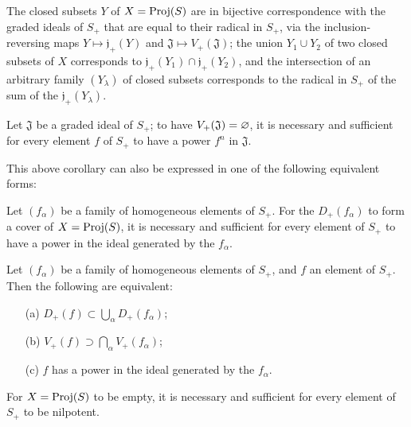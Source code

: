 \begin{corollary}[2.3.12]
\label{II.2.3.12}
The closed subsets $Y$ of $X=\operatorname{Proj}(S)$ are in bijective correspondence with the graded ideals of $S_+$ that are equal to their radical in $S_+$, via the inclusion-reversing maps $Y\mapsto\mathfrak{j}_+(Y)$ and $\mathfrak{J}\mapsto V_+(\mathfrak{J})$;
the union $Y_1\cup Y_2$ of two closed subsets of $X$ corresponds
to $\mathfrak{j}_+(Y_1)\cap\mathfrak{j}_+(Y_2)$, and the intersection of an arbitrary family $(Y_\lambda)$ of closed subsets corresponds to the radical in $S_+$ of the sum of the $\mathfrak{j}_+(Y_\lambda)$.
\end{corollary}

\begin{corollary}[2.3.13]
\label{II.2.3.13}
Let $\mathfrak{J}$ be a graded ideal of $S_+$;
to have $V_+(\mathfrak{J})=\varnothing$, it is necessary and sufficient for every element $f$ of $S_+$ to have a power $f^n$ in $\mathfrak{J}$.
\end{corollary}

This above corollary can also be expressed in one of the following equivalent forms:

\begin{corollary}[2.3.14]
Let $(f_\alpha)$ be a family of homogeneous elements of $S_+$.
For the $D_+(f_\alpha)$ to form a cover of $X=\operatorname{Proj}(S)$, it is necessary and sufficient for every element of $S_+$ to have a power in the ideal generated by the $f_\alpha$.
\label{II.2.3.14}
\end{corollary}

\begin{corollary}[2.3.15]
\label{II.2.3.15}
Let $(f_\alpha)$ be a family of homogeneous elements of $S_+$, and $f$ an element of $S_+$.
Then the following are equivalent:
\begin{enumerate}
  \item[{\rm(a)}] $D_+(f)\subset\bigcup_\alpha D_+(f_\alpha)$;
  \item[{\rm(b)}] $V_+(f)\supset\bigcap_\alpha V_+(f_\alpha)$;
  \item[{\rm(c)}] $f$ has a power in the ideal generated by the $f_\alpha$.
\end{enumerate}
\end{corollary}

\begin{corollary}[2.3.16]
\label{II.2.3.16}
For $X=\operatorname{Proj}(S)$ to be empty, it is necessary and sufficient for every element of $S_+$ to be nilpotent.
\end{corollary}

